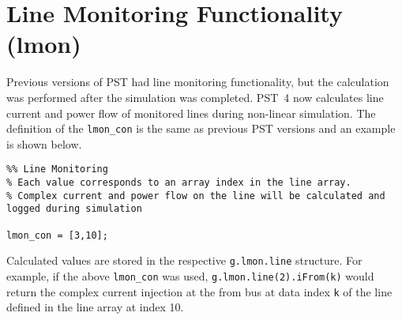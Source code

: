 \section{Line Monitoring Functionality (lmon)}  
Previous versions of PST had line monitoring functionality, but the calculation was performed after the simulation was completed.
\mbox{PST 4} now calculates line current and power flow of monitored lines during non-linear simulation.
The definition of the \verb|lmon_con| is the same as previous PST versions and an example is shown below.

\begin{verbatim}
%% Line Monitoring
% Each value corresponds to an array index in the line array.
% Complex current and power flow on the line will be calculated and logged during simulation

lmon_con = [3,10]; 
\end{verbatim}
\noindent Calculated values are stored in the respective \verb|g.lmon.line| structure.
For example, if the above \verb|lmon_con| was used, \verb|g.lmon.line(2).iFrom(k)| would return the complex current injection at the from bus at data index \verb|k| of the line defined in the line array at index 10.
